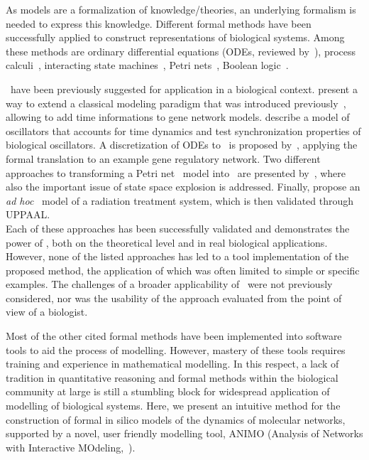 As models are a formalization of knowledge/theories, an underlying formalism is needed to express
this knowledge. Different formal methods have been successfully applied to construct representations
of biological systems. Among these methods are ordinary differential equations (ODEs, reviewed by~\citealp[]{hidde-review}),
process calculi~\citep{blenx,bio-pepa}, interacting state machines~\citep{interacting-sm1,interacting-sm2},
Petri nets~\citep{petri-nets,petri-nets2}, Boolean logic~\citep{boolean-networks-flower,boolean-networks2}.

\tas\ have been previously suggested for application in a biological context.
\cite{ta-siebert} present a way to extend a classical modeling paradigm
that was introduced previously~\citep{thomas-formalism}, allowing to add time informations to gene network models.
\cite{bartocci-oscillators} describe a model of oscillators that accounts for time
dynamics and test synchronization properties of biological oscillators.
A discretization of ODEs to \tas\ is proposed by~\citet{oded-ode-ta-discretization}, applying
the formal translation to an example gene regulatory network. Two different approaches to transforming
a Petri net~\citep{petri-nets} model into \tas\ are presented by~\citet{ta-giapponesi},
where also the important issue of state space explosion is addressed.
Finally, \cite{ta-radiazioni} propose an \emph{ad hoc} \tas\ model of a radiation treatment
system, which is then validated through UPPAAL.\\
Each of these approaches has been successfully validated and demonstrates the power of \tas,
both on the theoretical level and in real biological applications. However, none of the listed approaches
has led to a tool implementation of the proposed method, the application of which was often limited to simple
or specific examples. The challenges of a broader applicability of \tas\ were not previously considered,
nor was the usability of the approach evaluated from the point of view of a biologist.


Most of the other cited formal methods have been implemented into software tools to aid the process of modelling.
However, mastery of these tools requires
training and experience in mathematical modelling. In this respect, a lack of tradition in quantitative
reasoning and formal methods within the biological community at large is still a stumbling block for
widespread application of modelling of biological systems. Here, we present an intuitive method for the
construction of formal in silico models of the dynamics of molecular networks, supported by a novel,
user friendly modelling tool, ANIMO (Analysis of Networks with Interactive MOdeling,~\citealp[]{animo-bibe}).

